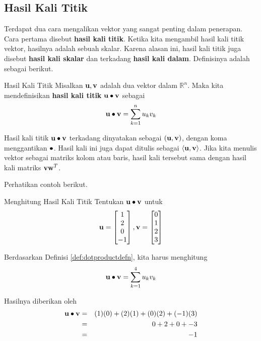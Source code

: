 \subsection{Hasil Kali Titik}

Terdapat dua cara mengalikan vektor yang sangat penting dalam
penerapan. Cara pertama disebut \textbf{hasil kali titik}. Ketika kita mengambil hasil kali titik vektor, hasilnya
adalah sebuah skalar. Karena alasan ini, hasil kali titik juga
disebut \textbf{hasil kali skalar} dan terkadang \textbf{hasil kali dalam}. Definisinya adalah sebagai berikut.

\begin{definition}{Hasil Kali Titik}\label{def:dotproductdefn}
Misalkan $\mathbf{u},\mathbf{v}$ adalah dua vektor dalam $\mathbb{R}^{n}$. Maka kita
mendefinisikan \textbf{hasil kali titik} $\mathbf{u}\bullet \mathbf{v}$ sebagai
\begin{equation*}
\mathbf{u}\bullet \mathbf{v} = \sum_{k=1}^{n}u_{k}v_{k}
\end{equation*}
\end{definition}

Hasil kali titik $\mathbf{u}\bullet \mathbf{v}$ terkadang dinyatakan sebagai $(\mathbf{u},\mathbf{v})$, dengan koma menggantikan $\bullet $. Hasil kali ini juga dapat ditulis
sebagai $\left\langle \mathbf{u},\mathbf{v}\right\rangle $. Jika kita menulis vektor sebagai matriks kolom atau baris, hasil kali tersebut
sama dengan hasil kali matriks $\mathbf{v}\mathbf{w}^{T}$.

Perhatikan contoh berikut.

\begin{example}{Menghitung Hasil Kali Titik}\label{exa:dotproduct}
Tentukan $\mathbf{u} \bullet \mathbf{v}$ untuk
\begin{equation*}
\mathbf{u}
=
\begin{bmatrix}
1 \\
2 \\
0 \\
-1
\end{bmatrix},
\mathbf{v}
=
\begin{bmatrix}
0 \\
1 \\
2 \\
3
\end{bmatrix}
\end{equation*}
\end{example}

\begin{solution}
Berdasarkan Definisi \ref{def:dotproductdefn}, kita harus menghitung
\begin{equation*}
\mathbf{u}\bullet \mathbf{v} = \sum_{k=1}^{4}u_{k}v_{k}
\end{equation*}

Hasilnya diberikan oleh
\begin{eqnarray*}
\mathbf{u} \bullet \mathbf{v}
&=&
(1)(0) + (2)(1) + (0)(2) + (-1)(3) \\
&=&
0 + 2 + 0 + -3 \\
&=&
-1
\end{eqnarray*}
\end{solution}

